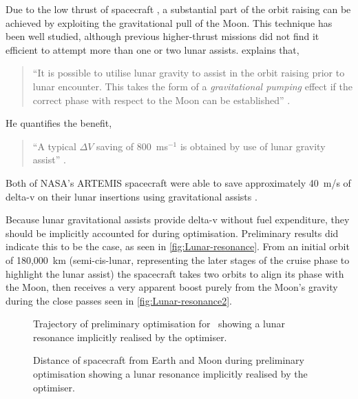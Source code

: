 Due to the low thrust of spacecraft \BW, a substantial part of the orbit raising can be achieved by exploiting the gravitational pull of the Moon. This technique has been well studied, although previous higher-thrust missions did not find it efficient to attempt more than one or two lunar assists. \textcite{Kemble2006} explains that,
\begin{quotation}
\enquote{It is possible to utilise lunar gravity to assist in the orbit raising prior to lunar encounter. This takes the form of a \emph{gravitational pumping} effect if the correct phase with respect to the Moon can be established} \parencite[p.249]{Kemble2006}. 
\end{quotation}
He quantifies the benefit,
\begin{quotation}
\enquote{A typical $\Delta V$ saving of 800~ms$^{-1}$ is obtained by use of lunar gravity assist} \parencite[p.248]{Kemble2006}.
\end{quotation}
Both of NASA's ARTEMIS spacecraft were able to save approximately 40~m/s of delta-v on their lunar insertions using gravitational assists \parencite{Sweetser2011}.  

Because lunar gravitational assists provide delta-v without fuel expenditure, they should be implicitly accounted for during optimisation. Preliminary results did indicate this to be the case, as seen in \autoref{fig:Lunar-resonance}. From an initial orbit of 180,000~km (semi-cis-lunar, representing the later stages of the cruise phase to highlight the lunar assist) the spacecraft takes two orbits to align its phase with the Moon, then receives a very apparent boost purely from the Moon's gravity during the close passes seen in \autoref{fig:Lunar-resonance2}.

\begin{figure}
\centering
\def\svgwidth{\figurewidth}

\caption{Trajectory of preliminary optimisation for \BW\ showing a lunar resonance implicitly realised by the optimiser.} \label{fig:Lunar-resonance}
\end{figure}

\begin{figure}
\centering
\def\svgwidth{\figurewidth}

\caption{Distance of spacecraft from Earth and Moon during preliminary optimisation showing a lunar resonance implicitly realised by the optimiser.} \label{fig:Lunar-resonance2}
\end{figure}




